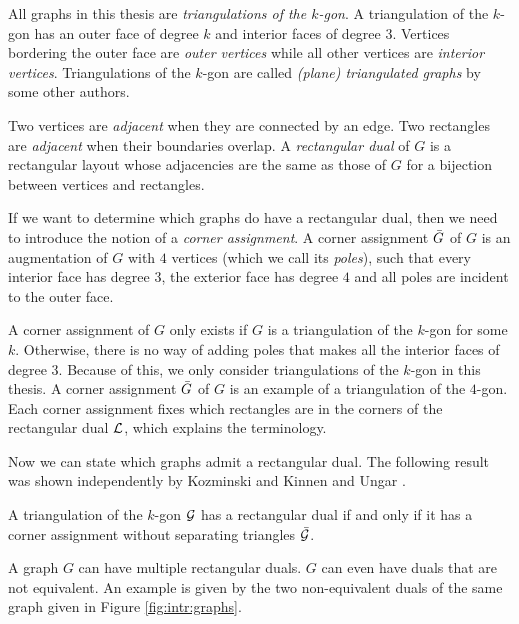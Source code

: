   All graphs in this thesis are \emph{triangulations of the $k$-gon}. A triangulation of the $k$-gon has an outer face of degree $k$ and interior faces of degree $3$.
  Vertices bordering the outer face are \emph{outer vertices} while all other vertices are \emph{interior vertices}.
  Triangulations of the $k$-gon are called \emph{(plane) triangulated graphs} by some other authors.

  Two vertices are \emph{adjacent} when they are connected by an edge. Two rectangles are \emph{adjacent} when their boundaries overlap. A \emph{rectangular dual} of $G$ is a rectangular layout whose adjacencies are the same as those of $G$ for a bijection between vertices and rectangles.

  If we want to determine which graphs do have a rectangular dual, then we need to introduce the notion of a \emph{corner assignment}.
  A corner assignment $\bar{G}$ of $G$ is an augmentation of $G$ with $4$ vertices (which we call its \emph{poles}), such that every interior face has degree $3$, the exterior face has degree $4$ and all poles are incident to the outer face.

  A corner assignment of $G$ only exists if $G$ is a triangulation of the $k$-gon for some $k$. Otherwise, there is no way of adding poles that makes all the interior faces of degree $3$. Because of this, we only consider triangulations of the $k$-gon in this thesis. A corner assignment $\bar{G}$ of $G$ is an example of a triangulation of the $4$-gon. Each corner assignment fixes which rectangles are in the corners of the rectangular dual $\mathcal{L}$, which explains the terminology.

  Now we can state which graphs admit a rectangular dual. The following result was shown independently by Kozminski and Kinnen \cite{Kozminski1984} and Ungar \cite{Ungar1953}.

  \begin{thrm}
    \label{th:rect:exsitenceREctangularDual}
    A triangulation of the $k$-gon $\mathcal{G}$ has a rectangular dual if and only if it has a corner assignment without separating triangles $\bar{\mathcal{G}}$.
  \end{thrm}

  A graph $G$ can have multiple rectangular duals. $G$ can even have duals that are not equivalent. An example is given by the two non-equivalent duals of the same graph given in Figure \ref{fig:intr:graphs}.

